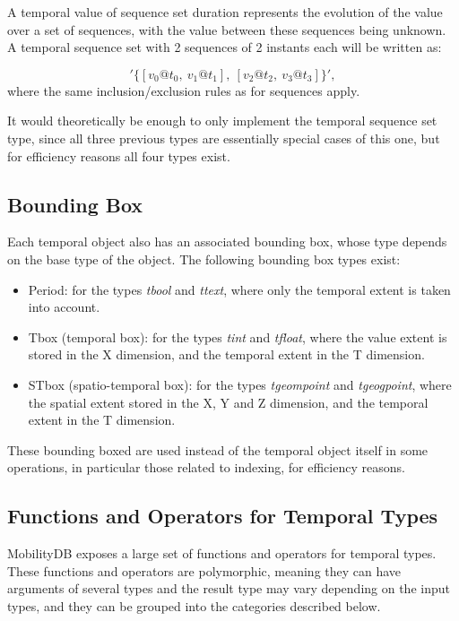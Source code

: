 A temporal value of sequence set duration represents the evolution of the value over a set of sequences, with the value between these sequences being unknown. A temporal sequence set with 2 sequences of 2 instants each will be written as:

\[
    '\{[v_0@t_0,\ v_1@t_1],\ [v_2@t_2,\ v_3@t_3]\}',
\]
where the same inclusion/exclusion rules as for sequences apply.

It would theoretically be enough to only implement the temporal sequence set type, since all three previous types are essentially special cases of this one, but for efficiency reasons all four types exist.

\subsection{Bounding Box}
\label{section:mobilitydb_bbox}

Each temporal object also has an associated bounding box, whose type depends on the base type of the object. The following bounding box types exist:

\begin{itemize}
    \item Period: for the types \textit{tbool} and \textit{ttext}, where only the temporal extent is taken into account.
    \item Tbox (temporal box): for the types \textit{tint} and \textit{tfloat}, where the value extent is stored in the X dimension, and the temporal extent in the T dimension.
    \item STbox (spatio-temporal box): for the types \textit{tgeompoint} and \textit{tgeogpoint}, where the spatial extent stored in the X, Y and Z dimension, and the temporal extent in the T dimension.
\end{itemize}

These bounding boxed are used instead of the temporal object itself in some operations, in particular those related to indexing, for efficiency reasons.

\subsection{Functions and Operators for Temporal Types}
\label{section:mobilitydb_functions}

MobilityDB exposes a large set of functions and operators for temporal types. These functions and operators are polymorphic, meaning they can have arguments of several types and the result type may vary depending on the input types, and they can be grouped into the categories described below. 

